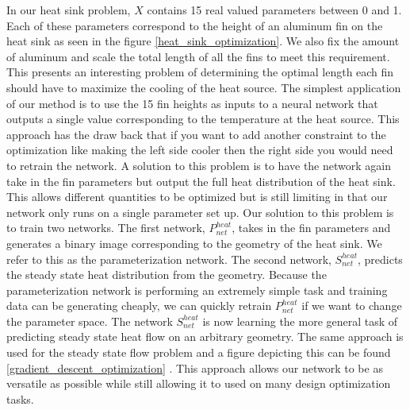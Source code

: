\documentclass{article} %
\begin{document}
In our heat sink problem, $X$ contains 15 real valued parameters between 0 and 1. Each of these parameters correspond to the height of an aluminum fin on the heat sink as seen in the figure \ref{heat_sink_optimization}. We also fix the amount of aluminum and scale the total length of all the fins to meet this requirement. This presents an interesting problem of determining the optimal length each fin should have to maximize the cooling of the heat source. The simplest application of our method is to use the 15 fin heights as inputs to a neural network that outputs a single value corresponding to the temperature at the heat source. This approach has the draw back that if you want to add another constraint to the optimization like making the left side cooler then the right side you would need to retrain the network. A solution to this problem is to have the network again take in the fin parameters but output the full heat distribution of the heat sink. This allows different quantities to be optimized but is still limiting in that our network only runs on a single parameter set up. Our solution to this problem is to train two networks. The first network, $P^{heat}_{net}$, takes in the fin parameters and generates a binary image corresponding to the geometry of the heat sink. We refer to this as the parameterization network. The second network, $S^{heat}_{net}$, predicts the steady state heat distribution from the geometry. Because the parameterization network is performing an extremely simple task and training data can be generating cheaply, we can quickly retrain $P^{heat}_{net}$ if we want to change the parameter space. The network $S^{heat}_{net}$ is now learning the more general task of predicting steady state heat flow on an arbitrary geometry. The same approach is used for the steady state flow problem and a figure depicting this can be found \ref{gradient_descent_optimization} . This approach allows our network to be as versatile as possible while still allowing it to used on many design optimization tasks.
\end{document}
